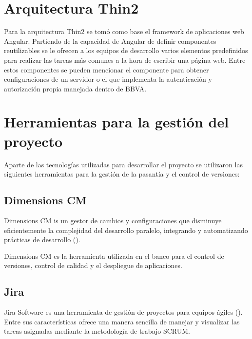 \section{Arquitectura Thin2}

Para la arquitectura Thin2 se tomó como base el framework de aplicaciones web Angular. Partiendo
de la capacidad de Angular de definir componentes reutilizables se le ofrecen a los
equipos de desarrollo varios elementos predefinidos para realizar las tareas más
comunes a la hora de escribir una página web. Entre estos componentes se pueden
mencionar el componente para obtener configuraciones de un servidor o el que implementa
la autenticación y autorización propia manejada dentro de BBVA.

\section{Herramientas para la gestión del proyecto}

Aparte de las tecnologías utilizadas para desarrollar el proyecto se utilizaron
las siguientes herramientas para la gestión de la pasantía y el control de versiones:

\subsection{Dimensions CM}

Dimensions CM is un gestor de cambios y configuraciones que disminuye eficientemente
la complejidad del desarrollo paralelo, integrando y automatizando prácticas de desarrollo
(\cite{DIMENSIONS}).

Dimensions CM es la herramienta utilizada en el banco para el control de versiones, control de
calidad y el despliegue de aplicaciones.

\subsection{Jira}

Jira Software es una herramienta de gestión de proyectos para equipos ágiles (\cite{JIRA}).
Entre sus características ofrece una manera sencilla de manejar y visualizar
las tareas asignadas mediante la metodología de trabajo SCRUM.
